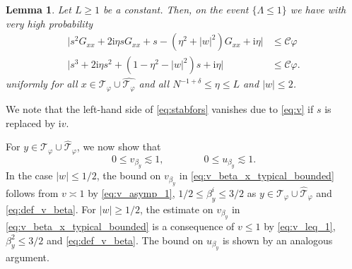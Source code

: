 \documentclass[10pt,a4paper]{amsart}
\newcommand{\ii}{\mathrm{i}}
\newcommand{\abs}[1]{\left| #1 \right|}
\newcommand{\absb}[1]{\bigl| #1 \bigr|}
\newtheorem{lemma}{Lemma}[section]
\numberwithin{equation}{section}
\newcommand*\ubarr[1]{{\widehat{#1}}}
\begin{document}
	\begin{lemma}\label{lem:meanoftypicalvertices}
		Let $L \geq 1$ be a constant. Then, on the event $\{\Lambda \leq 1\}$ we have with very high probability 
		\begin{align} \label{eq:s_G_xx_relation} 
			\absb{s^2 G_{xx} + 2\ii \eta s G_{xx} + s -(\eta^2 + \abs{w}^2) G_{xx} + \ii \eta} &\le  \mathcal{C} \varphi\\ 
			\label{eq:stabfors}
			\absb{s^3  + 2 \ii \eta s^2 +(1 - \eta^2 - \abs{w}^2)s+ \ii \eta} & \leq \mathcal C   \varphi .
		\end{align}
		uniformly for all $x \in \mathcal T_{\varphi}\cup \ubarr{\mathcal T_{\varphi}}$ and all $N^{-1+ \delta} \le \eta \le L$ and $ \abs{w} \le 2$.
	\end{lemma}
	
	We note that the left-hand side of \eqref{eq:stabfors} vanishes due to \eqref{eq:v}
	if $s$ is replaced by $\ii v$. 
	
	For $y \in \mathcal T_{\varphi} \cup \ubarr{\mathcal T}_{\varphi}$, we now show that  
	\begin{equation}
	0 \leq v_{\beta_y} \lesssim 1, \qquad \qquad 0 \leq u_{\beta_y} \lesssim 1  \label{eq:v_beta_x_typical_bounded}. 
	 \end{equation} 
	 In the case $\abs{w} \leq 1/2$, the bound on $v_{\beta_y}$ in \cref{eq:v_beta_x_typical_bounded} follows from $v \asymp 1$ by \cref{eq:v_asymp_1}, $1/2 \leq \beta_y^i \leq 3/2$ as $y \in \mathcal{T}_{\varphi} \cup \ubarr{\mathcal{T}}_{\varphi}$ and \cref{eq:def_v_beta}. 
	For $\abs{w} \geq 1/2$,  the estimate on $v_{\beta_y}$ in \cref{eq:v_beta_x_typical_bounded} is a consequence of $v \leq 1$ by \cref{eq:v_leq_1}, $\beta_y^2 \leq 3/2$ and \cref{eq:def_v_beta}. 
	The bound on $u_{\beta_y}$ is shown by an analogous argument.  
	
\end{document}
